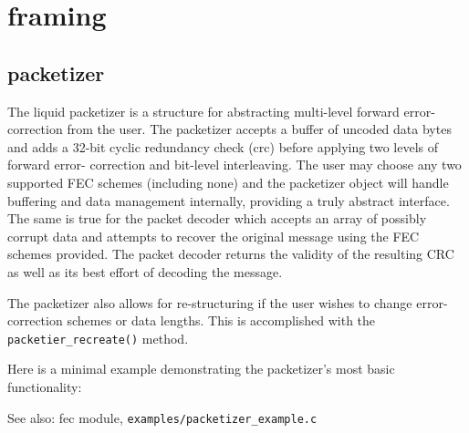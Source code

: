 % 
%

\section{framing}
\label{module:framing}

\subsection{packetizer}

The liquid packetizer is a structure for abstracting multi-level forward
error-correction from the user.
The packetizer accepts a buffer of uncoded data bytes and adds a 32-bit
cyclic redundancy check (crc) before applying two levels of forward error-
correction and bit-level interleaving.  The user may choose any two 
supported FEC schemes (including none) and the packetizer object will
handle buffering and data management internally, providing a truly abstract
interface.  The same is true for the packet decoder which accepts an array
of possibly corrupt data and attempts to recover the original message using
the FEC schemes provided.  The packet decoder returns the validity of the
resulting CRC as well as its best effort of decoding the message.

The packetizer also allows for re-structuring if the user wishes to change
error-correction schemes or data lengths.  This is accomplished with the
{\tt packetier\_recreate()} method.

Here is a minimal example demonstrating the packetizer's most basic
functionality:


See also: fec module, {\tt examples/packetizer\_example.c}


